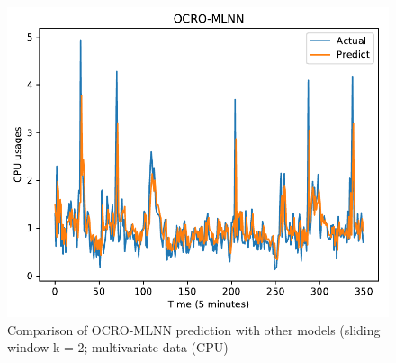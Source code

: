 \documentclass[review,3p,authoryear]{elsarticle}
\begin{document}
{\begin{figure}[!ht]
\begin{minipage}[b]{0.33\linewidth}
    \includegraphics[width=0.9\linewidth]{images/pdf/predict/k2/cpu_k2_ocro_mlnn.pdf} 
  \end{minipage} 
  
  \caption{Comparison of OCRO-MLNN prediction with other models (sliding window k = 2; multivariate data (CPU)} 
  \label{predict_cpu_sliding2} 
\end{figure}



}
\end{document}

